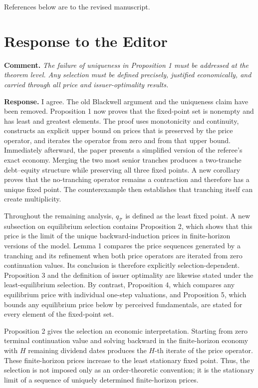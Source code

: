 \documentclass[11pt]{article}
\newcommand{\commenttext}[1]{\par\noindent\textbf{Comment.} \textit{#1}\par}
\newcommand{\response}[1]{\par\noindent\textbf{Response.} #1\par}
\begin{document}
References below are to the revised manuscript.

\section*{Response to the Editor}

\commenttext{The failure of uniqueness in Proposition 1 must be addressed at the theorem level. Any selection must be defined precisely, justified economically, and carried through all price and issuer-optimality results.}

\response{I agree. The old Blackwell argument and the uniqueness claim have been removed. Proposition 1 now proves that the fixed-point set is nonempty and has least and greatest elements. The proof uses monotonicity and continuity, constructs an explicit upper bound on prices that is preserved by the price operator, and iterates the operator from zero and from that upper bound. Immediately afterward, the paper presents a simplified version of the referee's exact economy. Merging the two most senior tranches produces a two-tranche debt--equity structure while preserving all three fixed points. A new corollary proves that the no-tranching operator remains a contraction and therefore has a unique fixed point. The counterexample then establishes that tranching itself can create multiplicity.

Throughout the remaining analysis, $q_{\mathcal T}$ is defined as the least fixed point. A new subsection on equilibrium selection contains Proposition 2, which shows that this price is the limit of the unique backward-induction prices in finite-horizon versions of the model. Lemma 1 compares the price sequences generated by a tranching and its refinement when both price operators are iterated from zero continuation values. Its conclusion is therefore explicitly selection-dependent. Proposition 3 and the definition of issuer optimality are likewise stated under the least-equilibrium selection. By contrast, Proposition 4, which compares any equilibrium price with individual one-step valuations, and Proposition 5, which bounds any equilibrium price below by perceived fundamentals, are stated for every element of the fixed-point set.

Proposition 2 gives the selection an economic interpretation. Starting from zero terminal continuation value and solving backward in the finite-horizon economy with $H$ remaining dividend dates produces the $H$-th iterate of the price operator. These finite-horizon prices increase to the least stationary fixed point. Thus, the selection is not imposed only as an order-theoretic convention; it is the stationary limit of a sequence of uniquely determined finite-horizon prices.}
\end{document}
